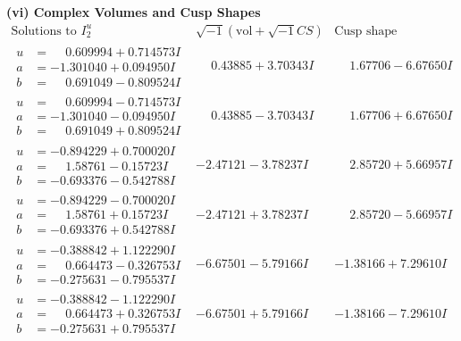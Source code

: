 \documentclass[1p]{elsarticle_modified}
\theoremstyle{definition}
\newcommand{\I}{\sqrt{-1}}
\begin{document}
\newpage\flushleft \textbf{(vi) Complex Volumes and Cusp Shapes}
$$\begin{array}{c|c|c}  
\text{Solutions to }I^u_{2}& \I (\text{vol} + \sqrt{-1}CS) & \text{Cusp shape}\\
 \hline 
\begin{aligned}
u &= \phantom{-}0.609994 + 0.714573 I \\
a &= -1.301040 + 0.094950 I \\
b &= \phantom{-}0.691049 - 0.809524 I\end{aligned}
 & \phantom{-}0.43885 + 3.70343 I & \phantom{-}1.67706 - 6.67650 I \\ \hline\begin{aligned}
u &= \phantom{-}0.609994 - 0.714573 I \\
a &= -1.301040 - 0.094950 I \\
b &= \phantom{-}0.691049 + 0.809524 I\end{aligned}
 & \phantom{-}0.43885 - 3.70343 I & \phantom{-}1.67706 + 6.67650 I \\ \hline\begin{aligned}
u &= -0.894229 + 0.700020 I \\
a &= \phantom{-}1.58761 - 0.15723 I \\
b &= -0.693376 - 0.542788 I\end{aligned}
 & -2.47121 - 3.78237 I & \phantom{-}2.85720 + 5.66957 I \\ \hline\begin{aligned}
u &= -0.894229 - 0.700020 I \\
a &= \phantom{-}1.58761 + 0.15723 I \\
b &= -0.693376 + 0.542788 I\end{aligned}
 & -2.47121 + 3.78237 I & \phantom{-}2.85720 - 5.66957 I \\ \hline\begin{aligned}
u &= -0.388842 + 1.122290 I \\
a &= \phantom{-}0.664473 - 0.326753 I \\
b &= -0.275631 - 0.795537 I\end{aligned}
 & -6.67501 - 5.79166 I & -1.38166 + 7.29610 I \\ \hline\begin{aligned}
u &= -0.388842 - 1.122290 I \\
a &= \phantom{-}0.664473 + 0.326753 I \\
b &= -0.275631 + 0.795537 I\end{aligned}
 & -6.67501 + 5.79166 I & -1.38166 - 7.29610 I \\ \hline\begin{aligned}

\end{aligned}
\end{array}$$
\end{document}

